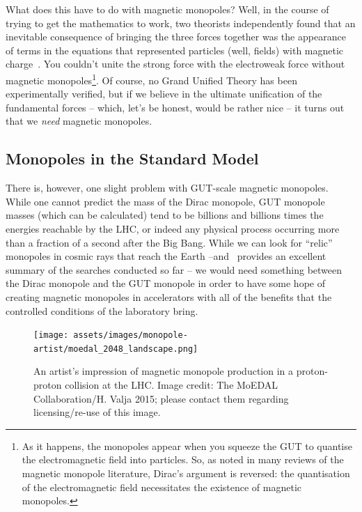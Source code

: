 What does this have to do with magnetic monopoles?
Well, in the course of trying to get the mathematics to work,
two theorists independently found that an inevitable consequence of bringing
the three forces together was the appearance of terms in the equations that
represented particles (well, fields) with
magnetic charge~\cite{tHooft1974,Polyakov1974}.
You couldn't unite the strong force with the electroweak force
without magnetic monopoles\footnote{%
As it happens, the monopoles appear when you squeeze the \ac{GUT} to
quantise the electromagnetic field into particles.
So, as noted in many reviews of the magnetic monopole literature,
Dirac’s argument is reversed: the quantisation of the electromagnetic
field necessitates the existence of magnetic monopoles.}.
%
Of course, no Grand Unified Theory has been experimentally verified,
but if we believe in the ultimate unification of the
fundamental forces -- which, let’s be honest, would be rather nice -- it
turns out that we \emph{need} magnetic monopoles.

\subsection{Monopoles in the Standard Model}
\label{sec:smmonopole}
There is, however, one slight problem with \ac{GUT}-scale magnetic monopoles.
While one cannot predict the mass of the Dirac monopole,
\ac{GUT} monopole masses (which can be calculated) tend to be billions
and billions times the energies reachable by the \ac{LHC}, or indeed any
physical process occurring more than a fraction of a second after the Big Bang.
While we can look for ``relic'' monopoles in cosmic rays that reach the
Earth --and~\cite{Patrizii2015} provides an excellent summary of the searches
conducted so far -- we would need something between the Dirac monopole
and the \ac{GUT} monopole in order to have some hope of creating
magnetic monopoles in accelerators with all of the benefits that the
controlled conditions of the laboratory bring.

%
\begin{figure}[htbp]
  \centering
  \texttt{[image: assets/images/monopole-artist/moedal\_2048\_landscape.png]}
  \caption[An artist's impression of magnetic monopole production at the LHC]
  {\label{fig:monopoleartist}%
An artist's impression of magnetic monopole production in a proton-proton
collision at the \acf{LHC}. Image credit: The MoEDAL Collaboration/H. Valja 2015;
please contact them regarding licensing/re-use of this image.}
\end{figure}
%

